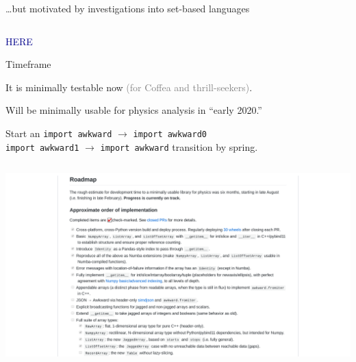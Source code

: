 \documentclass[aspectratio=169]{beamer}
\begin{document}
\begin{frame}[fragile]{\ldots but motivated by investigations into set-based languages}
\begin{columns}
\large
{}
\end{columns}
\end{frame}

\begin{frame}{}
\huge
\vspace{1 cm}
\begin{center}
\textcolor{darkblue}{HERE}
\end{center}
\end{frame}

\begin{frame}{Timeframe}
\Large
\begin{center}
It is minimally testable now \textcolor{gray}{(for Coffea and thrill-seekers)}.

\vspace{1 cm}
Will be minimally usable for physics analysis in ``early 2020.''

\vspace{1 cm}
\end{center}

Start an {\normalsize \texttt{import awkward}} $\to$ {\normalsize \texttt{import awkward0}} \\
\phantom{Start an} {\normalsize \texttt{import awkward1}} $\to$ {\normalsize \texttt{import awkward}} transition by spring.
\end{frame}

\begin{frame}{}
\vspace{-0.02 cm}
\begin{columns}
\includegraphics[width=\linewidth]{awkward-roadmap.png}
\end{columns}
\end{frame}
\end{document}
